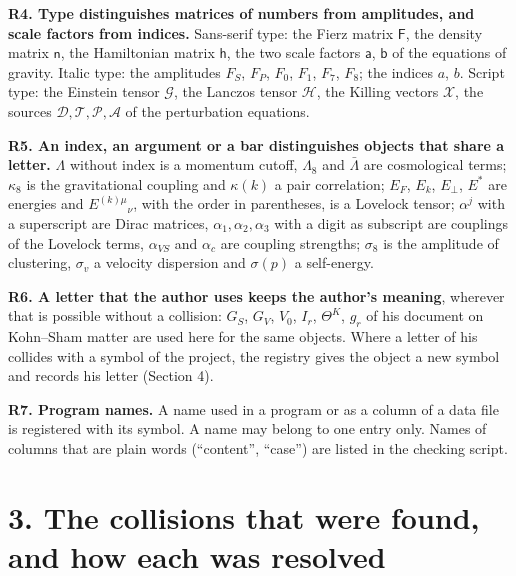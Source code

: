 \documentclass[
  10pt,
]{article}
\begin{document}
\textbf{R4. Type distinguishes matrices of numbers from amplitudes, and
scale factors from indices.} Sans-serif type: the Fierz matrix
\(\mathsf F\), the density matrix \(\mathsf n\), the Hamiltonian matrix
\(\mathsf h\), the two scale factors \(\mathsf a\), \(\mathsf b\) of the
equations of gravity. Italic type: the amplitudes \(F_S\), \(F_P\),
\(F_0\), \(F_1\), \(F_7\), \(F_8\); the indices \(a\), \(b\). Script
type: the Einstein tensor \(\mathcal G\), the Lanczos tensor
\(\mathcal H\), the Killing vectors \(\mathcal X\), the sources
\(\mathcal D,\mathcal T,\mathcal P,\mathcal A\) of the perturbation
equations.

\textbf{R5. An index, an argument or a bar distinguishes objects that
share a letter.} \(\Lambda\) without index is a momentum cutoff,
\(\Lambda_8\) and \(\bar\Lambda\) are cosmological terms; \(\kappa_8\)
is the gravitational coupling and \(\kappa(k)\) a pair correlation;
\(E_F\), \(E_k\), \(E_\perp\), \(E^*\) are energies and
\(E^{(k)\mu}{}_\nu\), with the order in parentheses, is a Lovelock
tensor; \(\alpha^j\) with a superscript are Dirac matrices,
\(\alpha_1,\alpha_2,\alpha_3\) with a digit as subscript are couplings
of the Lovelock terms, \(\alpha_{VS}\) and \(\alpha_c\) are coupling
strengths; \(\sigma_8\) is the amplitude of clustering, \(\sigma_v\) a
velocity dispersion and \(\sigma(p)\) a self-energy.

\textbf{R6. A letter that the author uses keeps the author's meaning},
wherever that is possible without a collision: \(G_S\), \(G_V\),
\(V_0\), \(I_r\), \(\Theta^K\), \(g_r\) of his document on Kohn--Sham
matter are used here for the same objects. Where a letter of his
collides with a symbol of the project, the registry gives the object a
new symbol and records his letter (Section 4).

\textbf{R7. Program names.} A name used in a program or as a column of a
data file is registered with its symbol. A name may belong to one entry
only. Names of columns that are plain words (``content'', ``case'') are
listed in the checking script.

\hypertarget{the-collisions-that-were-found-and-how-each-was-resolved}{%
\section{3. The collisions that were found, and how each was
resolved}\label{the-collisions-that-were-found-and-how-each-was-resolved}}
\end{document}
